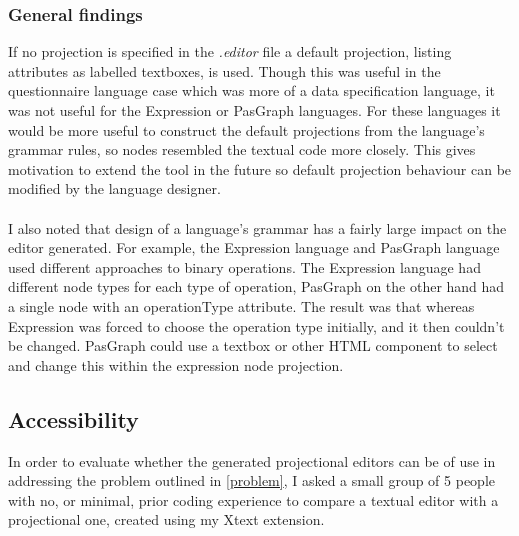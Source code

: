 \documentclass{article}
\begin{document}
\subsubsection{General findings}
If no projection is specified in the \emph{.editor} file a default projection, listing attributes as labelled textboxes, is used. Though this was useful in the questionnaire language case which was more of a data specification language, it was not useful for the Expression or PasGraph languages. For these languages it would be more useful to construct the default projections from the language's grammar rules, so nodes resembled the textual code more closely. This gives motivation to extend the tool in the future so default projection behaviour can be modified by the language designer.
\\
\\
I also noted that design of a language's grammar has a fairly large impact on the editor generated. For example, the Expression language and PasGraph language used different approaches to binary operations. The Expression language had different node types for each type of operation, PasGraph on the other hand had a single node with an operationType attribute. The result was that whereas Expression was forced to choose the operation type initially, and it  then couldn't be changed. PasGraph could use a textbox or other HTML component to select and change this within the expression node projection. 

\subsection{Accessibility}\label{Accessibility}
In order to evaluate whether the generated projectional editors can be of use in addressing the problem outlined in \ref{problem}, I asked a small group of 5 people with no, or minimal, prior coding experience to compare a textual editor with a projectional one, created using my Xtext extension.
\end{document}
